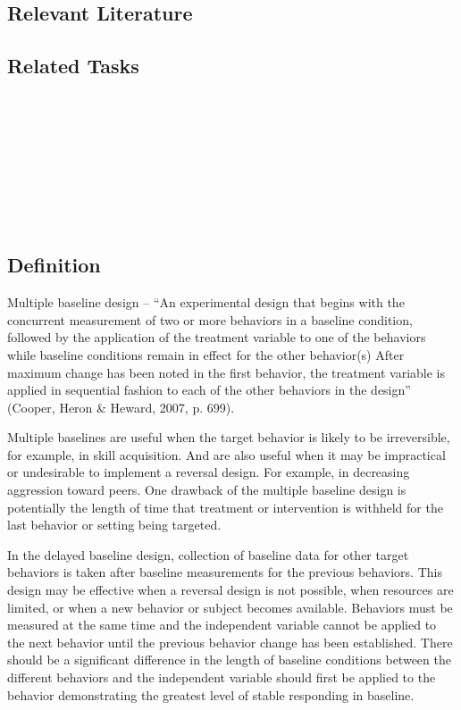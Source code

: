 \subsection{Relevant Literature}
\begin{refsection}
\nocite{cooper2007applied,
    hartmann1976changing,
    mcdougall2005range,
    mclaughlin1983examination,
    hall1977changing,
    allen2001exposure}
\printbibliography[heading=none]
\end{refsection}
%
\subsection{Related Tasks}
\fourbFour{}\\
\fourbFive{}\\
\fourbSeven{}\\
\fourbNine{}\\
\fourbEleven{}\\ 
\fourhFour{}\\
\fouriOne{}\\
%
%
%
%
%
%
%
%
\section{\fourbSeven{}}
\subsection{Definition}
Multiple baseline design – ``An experimental design that begins with the concurrent measurement of two or more behaviors in a baseline condition, followed by the application of the treatment variable to one of the behaviors while baseline conditions remain in effect for the other behavior(s) After maximum change has been noted in the first behavior, the treatment variable is applied in sequential fashion to each of the other behaviors in the design'' (Cooper, Heron \& Heward, 2007, p. 699).

Multiple baselines are useful when the target behavior is likely to be irreversible, for example, in skill acquisition. And are also useful when it may be impractical or undesirable to implement a reversal design. For example, in decreasing aggression toward peers. One drawback of the multiple baseline design is potentially the length of time that treatment or intervention is withheld for the last behavior or setting being targeted. 

In the delayed baseline design, collection of baseline data for other target behaviors is taken after baseline measurements for the previous behaviors. This design may be effective when a reversal design is not possible, when resources are limited, or when a new behavior or subject becomes available. Behaviors must be measured at the same time and the independent variable cannot be applied to the next behavior until the previous behavior change has been established. There should be a significant difference in the length of baseline conditions between the different behaviors and the independent variable should first be applied to the behavior demonstrating the greatest level of stable responding in baseline.

